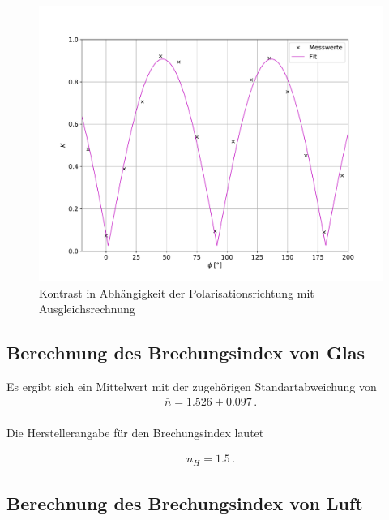 \begin{figure}[H]
  \centering
  \includegraphics[width=\textwidth]{kontrast.pdf}
  \caption{Kontrast in Abhängigkeit der Polarisationsrichtung mit
  Ausgleichsrechnung}
  \label{fig:kontrast}
\end{figure}
\subsection{Berechnung des Brechungsindex von Glas}


Es ergibt sich ein Mittelwert mit der zugehörigen Standartabweichung von
\begin{align*}
  \bar{n} = 1.526 \pm 0.097 \, .\\
\end{align*}

Die Herstellerangabe für den Brechungsindex lautet

\begin{align*}
  n_H = 1.5 \, .
\end{align*}




\subsection{Berechnung des Brechungsindex von Luft}


